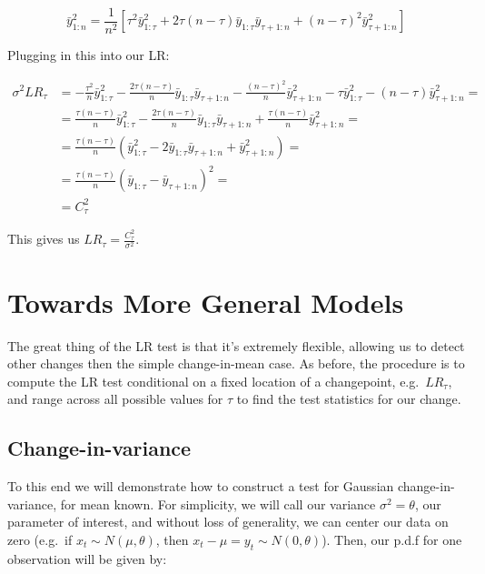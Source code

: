 \documentclass[
  letterpaper,
  DIV=11,
  numbers=noendperiod]{scrreprt}
\begin{document}
\[
\bar{y}_{1:n}^2 = \frac{1}{n^2}  \left[ \tau^2 \bar{y}_{1:\tau}^2 + 2 \tau (n - \tau) \bar{y}_{1:\tau}\bar{y}_{\tau+1:n} + (n - \tau)^2 \bar{y}_{\tau+1:n}^2 \right]
\]

Plugging in this into our LR:

\begin{align}
\sigma^2 LR_\tau &= - \frac{\tau^2}{n} \bar{y}_{1:\tau}^2 - \frac{2 \tau (n - \tau)}{n} \bar{y}_{1:\tau}\bar{y}_{\tau+1:n}  - \frac{(n - \tau)^2}{n} \bar{y}_{\tau+1:n}^2 - \tau \bar{y}_{1:\tau}^2 - (n - \tau) \bar{y}_{\tau+1:n}^2=\\
&=  \frac{\tau (n - \tau)}{n} \bar{y}_{1:\tau}^2 -  \frac{2 \tau (n - \tau)}{n} \bar{y}_{1:\tau}\bar{y}_{\tau+1:n} + \frac{\tau (n - \tau)}{n}  \bar{y}_{\tau+1:n}^2 = \\  
&= \frac{\tau (n - \tau)}{n} (\bar{y}_{1:\tau}^2  - 2 \bar{y}_{1:\tau}\bar{y}_{\tau+1:n} + \bar{y}_{\tau+1:n}^2)=\\
&= \frac{\tau (n - \tau)}{n} (\bar{y}_{1:\tau} - \bar{y}_{\tau+1:n})^2=\\
&= C_\tau^2
\end{align}

This gives us \(LR_\tau = \frac{C_\tau^2}{\sigma^2}\).

\section{Towards More General Models}\label{towards-more-general-models}

The great thing of the LR test is that it's extremely flexible, allowing
us to detect other changes then the simple change-in-mean case. As
before, the procedure is to compute the LR test conditional on a fixed
location of a changepoint, e.g.~\(LR_\tau\), and range across all
possible values for \(\tau\) to find the test statistics for our change.

\subsection{Change-in-variance}\label{change-in-variance}

To this end we will demonstrate how to construct a test for Gaussian
change-in-variance, for mean known. For simplicity, we will call our
variance \(\sigma^2 = \theta\), our parameter of interest, and without
loss of generality, we can center our data on zero (e.g.~if
\(x_t \sim N(\mu, \theta)\), then
\(x_t - \mu = y_t \sim N(0, \theta)\)). Then, our p.d.f for one
observation will be given by:
\end{document}
